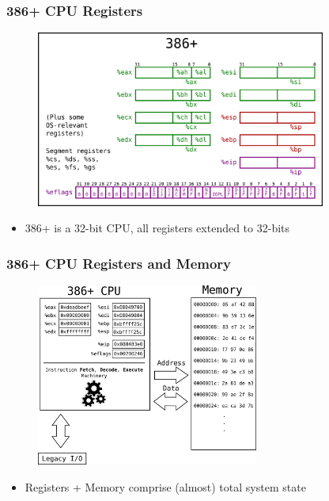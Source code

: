 \documentclass[11pt,xcolor=dvipsnames]{beamer}
\newcommand{\mvs}{\vspace{-0.95em}}
\begin{document}
\begin{frame}[fragile,t]
\frametitle{386+ CPU Registers}
\mvs
\begin{figure}
\centering \includegraphics[width=0.85\textwidth]{figures/386state.png}
\end{figure}
\begin{itemize}
    \item 386+ is a 32-bit CPU, all registers extended to 32-bits
\end{itemize}
\end{frame}

\begin{frame}[fragile,t]
\frametitle{386+ CPU Registers and Memory}
\mvs
\begin{figure}
\centering \includegraphics[width=0.65\textwidth]{figures/386statemem.png}
\end{figure}
\begin{itemize}
    \item Registers + Memory comprise (almost) total system state
\end{itemize}
\end{frame}
\end{document}
